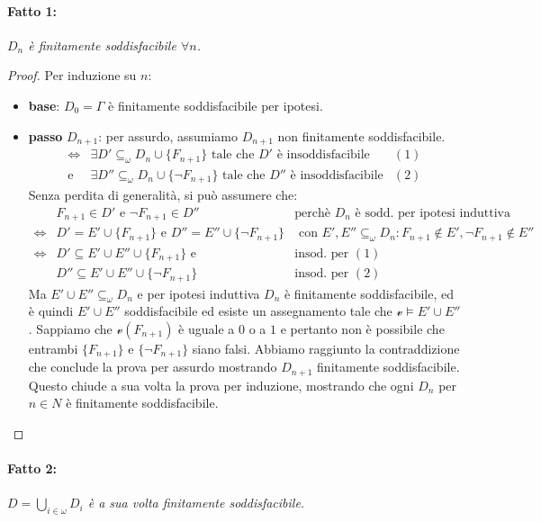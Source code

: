 \paragraph{Fatto 1:}
\textit{$D_n$ è finitamente soddisfacibile $\forall n$.}

\begin{proof}
Per induzione su $n$:
\begin{itemize}
  \item \textbf{base}: $D_0 = \Gamma$ è finitamente soddisfacibile per ipotesi.
  \item \textbf{passo} $D_{n+1}$: per assurdo, assumiamo $D_{n+1}$ non finitamente soddisfacibile.
  \begin{align*}
    \iff & \exists D' \subseteq_{\omega} D_{n}\cup \{F_{n+1}\} \text{ tale che } D' \text{ è insoddisfacibile} & (1)\\
    \text{e}\ & \exists D''\subseteq_{\omega} D_{n} \cup \{\neg F_{n+1}\} \text{ tale che } D''   \text{ è insoddisfacibile} & (2)
  \end{align*}
  Senza perdita di generalità, si può assumere che:
  \begin{align*}
    & F_{n+1} \in D' \text{ e } \neg F_{n+1} \in D'' & \text{perchè }D_n \text{ è sodd. per ipotesi induttiva}\\
    \iff & D' = E' \cup \{F_{n+1}\} \text{ e } D'' = E'' \cup \{\neg F_{n+1}\}
    & \text{ con } E', E'' \subseteq_\omega D_{n} : F_{n+1} \notin E', \neg F_{n+1} \notin E''\\
    \iff & D' \subseteq E' \cup E'' \cup \{F_{n+1}\} \text{ e } & \text{insod. per }(1)\\
    & D'' \subseteq E' \cup E'' \cup \{\neg F_{n+1}\} & \text{insod. per }(2)
  \end{align*}
  Ma $E' \cup E'' \subseteq_{\omega} D_{n}$ e per ipotesi induttiva $D_n$ è finitamente soddisfacibile, ed è quindi $E' \cup E''$ soddisfacibile ed esiste un assegnamento tale che $\mathcal{v} \models E' \cup E''$. Sappiamo che $\mathcal{v}(F_{n+1})$ è uguale a $0$ o a $1$ e pertanto non è possibile che entrambi $\{F_{n+1}\}$ e $\{\neg F_{n+1}\}$ siano falsi. Abbiamo raggiunto la contraddizione che conclude la prova per assurdo mostrando $D_{n+1}$ finitamente soddisfacibile. Questo chiude a sua volta la prova per induzione, mostrando che ogni $D_n$ per $n \in N$ è finitamente soddisfacibile. 
  \end{itemize}
\end{proof}
 
\paragraph{Fatto 2:}
\textit{$D = \bigcup\limits_{i \in \omega} D_i$ è a sua volta finitamente 
soddisfacibile.}

